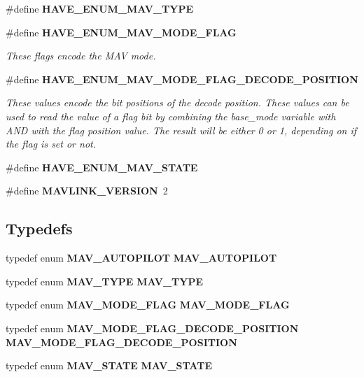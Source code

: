 \begin{DoxyCompactItemize}
\#define \textbf{ H\+A\+V\+E\+\_\+\+E\+N\+U\+M\+\_\+\+M\+A\+V\+\_\+\+T\+Y\+PE}
\item 
\#define \textbf{ H\+A\+V\+E\+\_\+\+E\+N\+U\+M\+\_\+\+M\+A\+V\+\_\+\+M\+O\+D\+E\+\_\+\+F\+L\+AG}
\begin{DoxyCompactList}\small\item\em These flags encode the M\+AV mode. \end{DoxyCompactList}\item 
\#define \textbf{ H\+A\+V\+E\+\_\+\+E\+N\+U\+M\+\_\+\+M\+A\+V\+\_\+\+M\+O\+D\+E\+\_\+\+F\+L\+A\+G\+\_\+\+D\+E\+C\+O\+D\+E\+\_\+\+P\+O\+S\+I\+T\+I\+ON}
\begin{DoxyCompactList}\small\item\em These values encode the bit positions of the decode position. These values can be used to read the value of a flag bit by combining the base\+\_\+mode variable with A\+ND with the flag position value. The result will be either 0 or 1, depending on if the flag is set or not. \end{DoxyCompactList}\item 
\#define \textbf{ H\+A\+V\+E\+\_\+\+E\+N\+U\+M\+\_\+\+M\+A\+V\+\_\+\+S\+T\+A\+TE}
\item 
\#define \textbf{ M\+A\+V\+L\+I\+N\+K\+\_\+\+V\+E\+R\+S\+I\+ON}~2
\end{DoxyCompactItemize}
\subsection*{Typedefs}
\begin{DoxyCompactItemize}
\item 
typedef enum \textbf{ M\+A\+V\+\_\+\+A\+U\+T\+O\+P\+I\+L\+OT} \textbf{ M\+A\+V\+\_\+\+A\+U\+T\+O\+P\+I\+L\+OT}
\item 
typedef enum \textbf{ M\+A\+V\+\_\+\+T\+Y\+PE} \textbf{ M\+A\+V\+\_\+\+T\+Y\+PE}
\item 
typedef enum \textbf{ M\+A\+V\+\_\+\+M\+O\+D\+E\+\_\+\+F\+L\+AG} \textbf{ M\+A\+V\+\_\+\+M\+O\+D\+E\+\_\+\+F\+L\+AG}
\item 
typedef enum \textbf{ M\+A\+V\+\_\+\+M\+O\+D\+E\+\_\+\+F\+L\+A\+G\+\_\+\+D\+E\+C\+O\+D\+E\+\_\+\+P\+O\+S\+I\+T\+I\+ON} \textbf{ M\+A\+V\+\_\+\+M\+O\+D\+E\+\_\+\+F\+L\+A\+G\+\_\+\+D\+E\+C\+O\+D\+E\+\_\+\+P\+O\+S\+I\+T\+I\+ON}
\item 
typedef enum \textbf{ M\+A\+V\+\_\+\+S\+T\+A\+TE} \textbf{ M\+A\+V\+\_\+\+S\+T\+A\+TE}
\end{DoxyCompactItemize}
